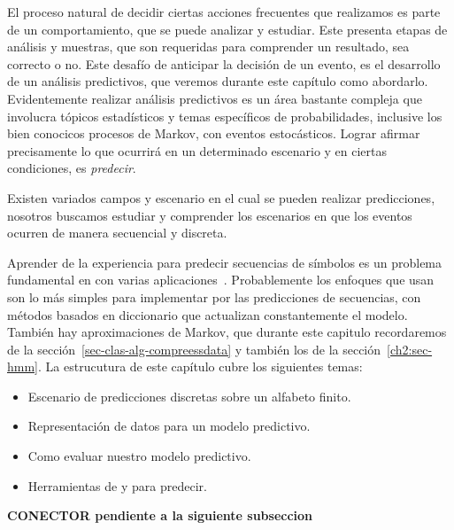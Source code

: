 El proceso natural de decidir ciertas acciones frecuentes que realizamos es parte de un comportamiento, que se puede analizar y estudiar. Este presenta etapas de análisis y muestras, que son requeridas para comprender un resultado, sea correcto o no. Este desafío de anticipar la decisión de un evento, es el desarrollo de un análisis predictivos, que veremos durante este capítulo como abordarlo. Evidentemente realizar análisis predictivos es un área bastante compleja que involucra tópicos estadísticos y temas específicos de probabilidades, inclusive los bien conocicos procesos de Markov, con eventos estocásticos. Lograr afirmar precisamente lo que ocurrirá en un determinado escenario y en ciertas condiciones, es \emph{predecir}.

Existen variados campos y escenario en el cual se pueden realizar predicciones, nosotros buscamos estudiar y comprender los escenarios en que los eventos ocurren de manera secuencial y discreta. 

Aprender de la experiencia para predecir secuencias de símbolos es un problema fundamental en \machinelearning con varias aplicaciones~\cite{Laird1994}. Probablemente los enfoques que usan \losslessdatacompression son lo más simples para implementar por las predicciones de secuencias, con métodos basados en diccionario que actualizan constantemente el modelo. También hay aproximaciones de Markov, que durante este capitulo recordaremos de la sección~\ref{sec-clas-alg-compreessdata} y también los \HMM de la sección~\ref{ch2:sec-hmm}. La estrucutura de este capítulo cubre los siguientes temas:
\begin{itemize}
	\menorEspacioItemize
	\item Escenario de predicciones discretas sobre un alfabeto finito.
	\item Representación de datos para un modelo predictivo.
	\item Como evaluar nuestro modelo predictivo.
	\item Herramientas de \machinelearning y \losslessdatacompression para predecir.
\end{itemize}




\textbf{CONECTOR pendiente a la siguiente subseccion}